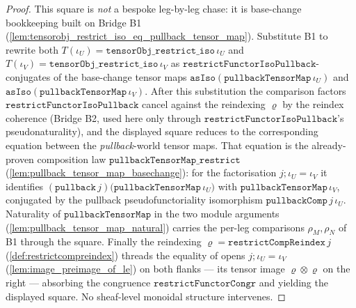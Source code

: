 \begin{proof}
  \leanok
  This square is \emph{not} a bespoke leg-by-leg chase: it is base-change bookkeeping built on
  Bridge B1 (\cref{lem:tensorobj_restrict_iso_eq_pullback_tensor_map}). Substitute B1 to rewrite
  both \(T(\iota_U) = \mathtt{tensorObj\_restrict\_iso}\,\iota_U\) and
  \(T(\iota_V) = \mathtt{tensorObj\_restrict\_iso}\,\iota_V\) as
  \(\mathtt{restrictFunctorIsoPullback}\)-conjugates of the base-change tensor maps
  \(\mathtt{asIso}(\mathtt{pullbackTensorMap}\,\iota_U)\) and
  \(\mathtt{asIso}(\mathtt{pullbackTensorMap}\,\iota_V)\). After this substitution the comparison
  factors \(\mathtt{restrictFunctorIsoPullback}\) cancel against the reindexing \(\varrho\) by the
  reindex coherence (Bridge B2, used here only through
  \(\mathtt{restrictFunctorIsoPullback}\)'s pseudonaturality), and the displayed square reduces to
  the corresponding equation between the \emph{pullback}-world tensor maps. That equation is the
  already-proven composition law \(\mathtt{pullbackTensorMap\_restrict}\)
  (\cref{lem:pullback_tensor_map_basechange}): for the factorisation
  \(j \mathbin{;} \iota_U = \iota_V\) it identifies
  \((\mathtt{pullback}\,j)\bigl(\mathtt{pullbackTensorMap}\,\iota_U\bigr)\) with
  \(\mathtt{pullbackTensorMap}\,\iota_V\), conjugated by the pullback pseudofunctoriality
  isomorphism \(\mathtt{pullbackComp}\,j\,\iota_U\). Naturality of \(\mathtt{pullbackTensorMap}\) in
  the two module arguments (\cref{lem:pullback_tensor_map_natural}) carries the per-leg comparisons
  \(\rho_M, \rho_N\) of B1 through the square. Finally the reindexing
  \(\varrho = \mathtt{restrictCompReindex}\,j\) (\cref{def:restrictcompreindex}) threads the
  equality of opens \(j \mathbin{;} \iota_U = \iota_V\) (\cref{lem:image_preimage_of_le}) on both
  flanks --- its tensor image \(\varrho \otimes \varrho\) on the right --- absorbing the
  congruence \(\mathtt{restrictFunctorCongr}\) and yielding the displayed square. No sheaf-level
  monoidal structure intervenes.
\end{proof}


